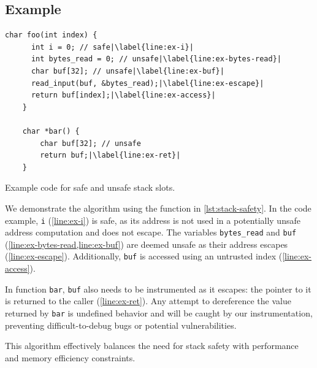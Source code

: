 \subsection{Example}
\label{subsec:example2}

\begin{lstfloat}
    \begin{lstlisting}[frame=h,style=customc,
        label={lst:stack-safety-inner},escapechar=|]
    char foo(int index) {
      int i = 0; // safe|\label{line:ex-i}|
      int bytes_read = 0; // unsafe|\label{line:ex-bytes-read}|
      char buf[32]; // unsafe|\label{line:ex-buf}|
      read_input(buf, &bytes_read);|\label{line:ex-escape}|
      return buf[index];|\label{line:ex-access}|
    }

    char *bar() {
        char buf[32]; // unsafe
        return buf;|\label{line:ex-ret}|
    }
    \end{lstlisting}
    \caption{Example code for safe and unsafe stack slots.}
    \label{lst:stack-safety}
\end{lstfloat}

We demonstrate the algorithm using the function in \cref{lst:stack-safety}.
In the code example, \texttt{i} (\cref{line:ex-i}) is safe, as its address is not used in a potentially unsafe address computation and does not escape.
The variables \texttt{bytes\_read} and \texttt{buf} (\cref{line:ex-bytes-read,line:ex-buf}) are deemed unsafe as their address escapes (\cref{line:ex-escape}).
Additionally, \texttt{buf} is accessed using an untrusted index (\cref{line:ex-access}).

\noindent
In function \texttt{bar}, \texttt{buf} also needs to be instrumented as it escapes: the pointer to it is returned to the caller (\cref{line:ex-ret}).
Any attempt to dereference the value returned by \texttt{bar} is undefined behavior and will be caught by our instrumentation, preventing difficult-to-debug bugs or potential vulnerabilities.

\noindent
This algorithm effectively balances the need for stack safety with performance and memory efficiency constraints.
